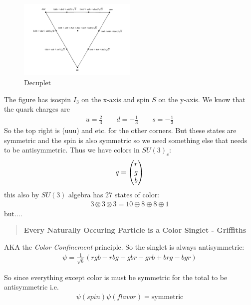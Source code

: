 \documentclass[../main.tex]{subfiles}
\begin{document}
\begin{itemize}
\begin{itemize}
        \begin{figure}[ht]
            \centering
            \includegraphics[width=0.5\textwidth]{decuplet.png}
            \caption{Decuplet}
            \label{fig:invertedcolor}
        \end{figure}
        The figure has isospin $I_3$ on the x-axis and spin $S$ on the y-axis.
        We know that the quark charges are
        \begin{align*}
            u = \frac{2}{3} \qquad d = -\frac{1}{3} \qquad s = -\frac{1}{3}
        \end{align*}
        So the top right is (uuu) and etc. for the other corners. But these states are symmetric and
        the spin is also symmetric so we need something else that needs to be antisymmetric. Thus
        we have colors in $SU(3)_c$:
        \begin{align*}
            q = \mqty(r \\ g \\ b)
        \end{align*}
        this also by $SU(3)$ algebra has 27 states of color:
        \begin{align*}
            3 \otimes 3 \otimes 3 = 10 \oplus 8 \oplus 8 \oplus 1
        \end{align*}
        but....
        \begin{quote}
            \textbf{Every Naturally Occuring Particle is a Color Singlet - Griffiths}
        \end{quote}
        AKA the \emph{Color Confinement} principle. So the singlet is always antisymmetric:
        \begin{align*}
            \psi = \frac{1}{\sqrt{6}} (rgb - rbg + gbr - grb + brg - bgr)
        \end{align*}
    \end{itemize}
    So since everything except color is must be symmetric for the total to be antisymmetric i.e.
    \begin{align*}
        \psi(spin) \psi(flavor) = \text{symmetric}
    \end{align*}

\end{itemize}
\end{document}
